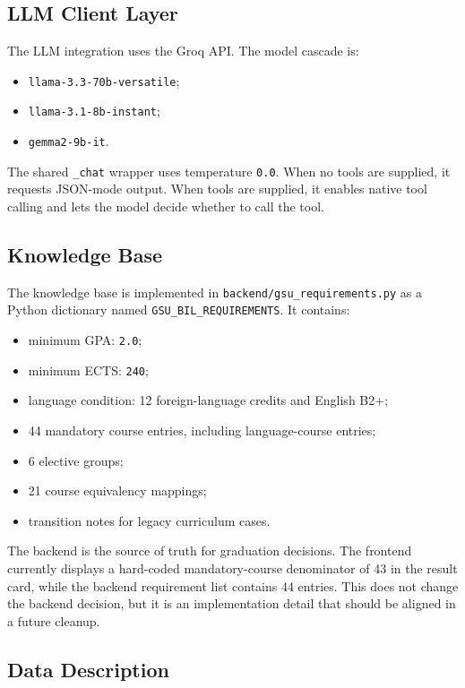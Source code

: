 \documentclass[11pt,a4paper]{article}
\begin{document}
\subsection{LLM Client Layer}

The LLM integration uses the Groq API. The model cascade is:

\begin{itemize}
  \item \texttt{llama-3.3-70b-versatile};
  \item \texttt{llama-3.1-8b-instant};
  \item \texttt{gemma2-9b-it}.
\end{itemize}

The shared \texttt{\_chat} wrapper uses temperature \texttt{0.0}. When no tools
are supplied, it requests JSON-mode output. When tools are supplied, it enables
native tool calling and lets the model decide whether to call the tool.

\subsection{Knowledge Base}

The knowledge base is implemented in \texttt{backend/gsu\_requirements.py} as a
Python dictionary named \texttt{GSU\_BIL\_REQUIREMENTS}. It contains:

\begin{itemize}
  \item minimum GPA: \texttt{2.0};
  \item minimum ECTS: \texttt{240};
  \item language condition: 12 foreign-language credits and English B2+;
  \item 44 mandatory course entries, including language-course entries;
  \item 6 elective groups;
  \item 21 course equivalency mappings;
  \item transition notes for legacy curriculum cases.
\end{itemize}

The backend is the source of truth for graduation decisions. The frontend currently displays a hard-coded mandatory-course denominator of 43 in the result card, while the backend requirement list contains 44 entries. This does not change the backend decision, but it is an implementation detail that should be aligned in a future cleanup.

\subsection{Data Description}
\end{document}
